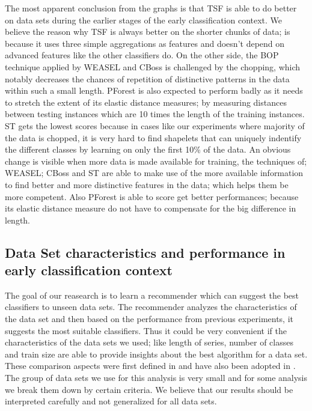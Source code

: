 The most apparent conclusion from the graphs is that TSF is able to do better on data sets during the earlier stages of the early classification context.
We believe the reason why TSF is always better on the shorter chunks of data; is because it uses three simple aggregations as features and doesn't depend on advanced features like the other classifiers do.
On the other side, the BOP technique applied by WEASEL and CBoss is challenged by the chopping, which notably decreases the chances of repetition of distinctive patterns in the data within such a small length.
PForest is also expected to perform badly as it needs to stretch the extent of its elastic distance measures; by measuring distances between testing instances which are 10 times the length of the training instances.
ST gets the lowest scores because in cases like our experiments where majority of the data is chopped, it is very hard to find shapelets that can uniquely indentify the different classes by learning on only the first 10\% of the data.
An obvious change is visible when more data is made available for training, the techniques of; WEASEL; CBoss and ST are able to make use of the more available information
to find better and more distinctive features in the data; which helps them be more competent.
Also PForest is able to score get better performances; because its elastic distance measure do not have to compensate for the big difference in length.


\subsection{Data Set characteristics and performance in early classification context}
\label{SubsectionDataCharacteristicsandPerformance}
The goal of our reasearch is to learn a recommender which can suggest the best classifiers to unseen data sets.
The recommender analyzes the characteristics of the data set and then based on the performance from previous experiments, it suggests the most suitable classifiers.
Thus it could be very convenient if the characteristics of the data sets we used; like length of series, number of classes and train size are able to provide insights about the best algorithm for a data set.
These comparison aspects were first defined in \cite{bagnall2017great} and have also been adopted in \cite{fawaz2019deepreview}.
The group of data sets we use for this analysis is very small and for some analysis we break them down by certain criteria.
We believe that our results should be interpreted carefully and not generalized for all data sets.

